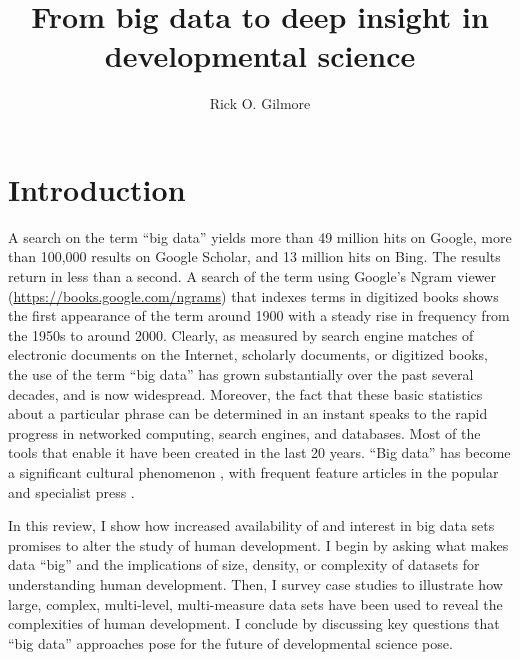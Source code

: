 \documentclass[letterpaper,man,apacite,natbib]{apa6}
\title{From big data to deep insight in developmental science}
\author{Rick O. Gilmore}
\affiliation{{The Pennsylvania State University}, {The Databrary Project}}
\begin{document}
\maketitle

\section{Introduction}

A search on the term ``big data'' yields more than 49 million hits on Google, more than 100,000 results on Google Scholar, and 13 million hits on Bing.
The results return in less than a second.
A search of the term using Google's Ngram viewer (\url{https://books.google.com/ngrams}) that indexes terms in digitized books shows the first appearance of the term around 1900 with a steady rise in frequency from the 1950s to around 2000.
Clearly, as measured by search engine matches of electronic documents on the Internet, scholarly documents, or digitized books, the use of the term ``big data'' has grown substantially over the past several decades, and is now widespread.
Moreover, the fact that these basic statistics about a particular phrase can be determined in an instant speaks to the rapid progress in networked computing, search engines, and databases.
Most of the tools that enable it have been created in the last 20 years.
``Big data'' has become a significant cultural phenomenon \cite{borgman_big_2015,boyd_critical_2012}, with frequent feature articles in the popular \cite{lohr_big_2012,Marcus2013} and specialist press \cite{HBR2015,Press2013a}.

In this review, I show how increased availability of and interest in big data sets promises to alter the study of human development.
I begin by asking what makes data ``big'' and the implications of size, density, or complexity of datasets for understanding human development.
Then, I survey case studies to illustrate how large, complex, multi-level, multi-measure data sets have been used to reveal the complexities of human development.
I conclude by discussing key questions that ``big data'' approaches pose for the future of developmental science pose.
\end{document}
